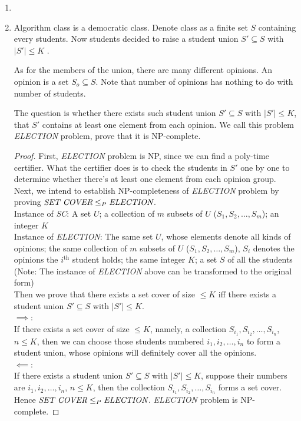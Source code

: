 \documentclass[12pt,a4paper]{article}
\makeatletter
\newtheorem*{solution}{Solution}
\theoremstyle{definition}
\renewenvironment{solution}[1][Solution] {\par\pushQED{\qed}\normalfont\topsep6\p@\@plus6\p@\relax\trivlist\item[\hskip\labelsep\bfseries#1\@addpunct{.}]\ignorespaces}{\popQED\endtrivlist\@endpefalse} \makeatother
\makeatother
\begin{document}
\begin{enumerate}
\begin{solution}
\begin{enumerate}
        \end{enumerate}
    \end{solution}

	\item Algorithm class is a democratic class. Denote class as a finite set $S$ containing every students. Now students decided to raise a student union $S' \subseteq S$ with $|S'|\leq K$ .
	
	As for the members of the union, there are many different opinions. An opinion is a set $S_o\subseteq S$. Note that number of opinions has nothing to do with number of students.
	
	The question is whether there exists such student union $S' \subseteq S$ with $|S'|\leq K$, that $S'$ contains at least one element from each opinion. We call this problem \emph{ELECTION} problem, prove that it is NP-complete.
	\begin{proof}
		First, \emph{ELECTION} problem is NP, since we can find a poly-time certifier. What the certifier does is to check the students in $S'$ one by one to determine whether there's at least one element from each opinion group. \\
		Next, we intend to establish NP-completeness of \emph{ELECTION} problem by proving $\emph{SET COVER} \leq _P \emph{ELECTION}$. \\
		Instance of \emph{SC}: A set $U$; a collection of $m$ subsets of $U$ ($S_1, S_2, \dots , S_m$); an integer $K$ \\
		Instance of \emph{ELECTION}: The same set $U$, whose elements denote all kinds of opinions; the same collection of $m$ subsets of $U$ ($S_1, S_2, \dots , S_m$), $S_i$ denotes the opinions the $i ^{\text{th}}$ student holds; the same integer $K$; a set $S$ of all the students \\
		(Note: The instance of \emph{ELECTION} above can be transformed to the original form) \\
		Then we prove that there exists a set cover of size $\leq K$ iff there exists a student union $S' \subseteq S$ with $|S'|\leq K$. \\
		$\implies$: \\
		If there exists a set cover of size $\leq K$, namely, a collection $S_{i_1}, S_{i_2}, \dots , S_{i_n}$, $n \leq K$, then we can choose those students numbered $i_1, i_2, \dots , i_n$ to form a student union, whose opinions will definitely cover all the opinions. \\
		$\impliedby$: \\
		If there exists a student union $S' \subseteq S$ with $|S'|\leq K$, suppose their numbers are $i_1, i_2, \dots , i_n$, $n \leq K$, then the collection $S_{i_1}, S_{i_2}, \dots , S_{i_n}$ forms a set cover. \\
		Hence $\emph{SET COVER} \leq _P \emph{ELECTION}$. \emph{ELECTION} problem is NP-complete.
	\end{proof}


\end{enumerate}
\end{document}
